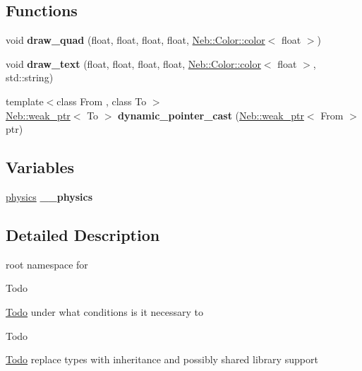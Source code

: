 \subsection*{\-Functions}
\begin{DoxyCompactItemize}
\item 
\hypertarget{namespaceNeb_a8ebdfeffa1def13492f72074015c2876}{void {\bfseries draw\-\_\-quad} (float, float, float, float, \hyperlink{classNeb_1_1Color_1_1color}{\-Neb\-::\-Color\-::color}$<$ float $>$)}\label{namespaceNeb_a8ebdfeffa1def13492f72074015c2876}

\item 
\hypertarget{namespaceNeb_a7daf427c7b6f28a6da236451dc42f6d1}{void {\bfseries draw\-\_\-text} (float, float, float, float, \hyperlink{classNeb_1_1Color_1_1color}{\-Neb\-::\-Color\-::color}$<$ float $>$, std\-::string)}\label{namespaceNeb_a7daf427c7b6f28a6da236451dc42f6d1}

\item 
\hypertarget{namespaceNeb_a4ed152a7fe9e22a11580d60f1d14b2d2}{{\footnotesize template$<$class From , class To $>$ }\\\hyperlink{classNeb_1_1weak__ptr}{\-Neb\-::weak\-\_\-ptr}$<$ \-To $>$ {\bfseries dynamic\-\_\-pointer\-\_\-cast} (\hyperlink{classNeb_1_1weak__ptr}{\-Neb\-::weak\-\_\-ptr}$<$ \-From $>$ ptr)}\label{namespaceNeb_a4ed152a7fe9e22a11580d60f1d14b2d2}

\end{DoxyCompactItemize}
\subsection*{\-Variables}
\begin{DoxyCompactItemize}
\item 
\hypertarget{namespaceNeb_a16bff826fe3b967c09a5f37850d60ee5}{\hyperlink{classNeb_1_1physics}{physics} {\bfseries \-\_\-\-\_\-physics}}\label{namespaceNeb_a16bff826fe3b967c09a5f37850d60ee5}

\end{DoxyCompactItemize}


\subsection{\-Detailed \-Description}
root namespace for  \begin{DoxyRefDesc}{\-Todo}
\item[\hyperlink{todo__todo000006}{\-Todo}]under what conditions is it necessary to \end{DoxyRefDesc}


\begin{DoxyRefDesc}{\-Todo}
\item[\hyperlink{todo__todo000017}{\-Todo}]replace types with inheritance and possibly shared library support \end{DoxyRefDesc}
